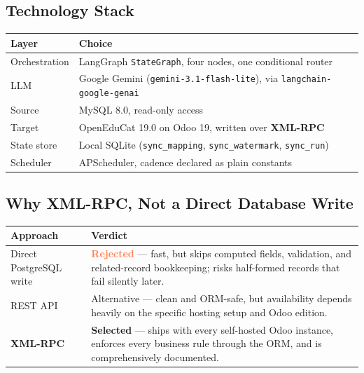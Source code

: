 \documentclass[11pt,a4paper]{article}
\begin{document}
\subsection{Technology Stack}
\begin{table}[h]
\centering
\begin{tabularx}{\textwidth}{@{}l>{\raggedright\arraybackslash}X@{}}
\toprule
\rowcolor{navy!10}
\textbf{\color{navy}Layer} & \textbf{\color{navy}Choice} \\
\midrule
Orchestration & LangGraph \texttt{StateGraph}, four nodes, one conditional router \\
LLM & Google Gemini (\texttt{gemini-3.1-flash-lite}), via \texttt{langchain-google-genai} \\
Source & MySQL 8.0, read-only access \\
Target & OpenEduCat 19.0 on Odoo 19, written over \textbf{XML-RPC} \\
State store & Local SQLite (\texttt{sync\_mapping}, \texttt{sync\_watermark}, \texttt{sync\_run}) \\
Scheduler & APScheduler, cadence declared as plain constants \\
\bottomrule
\end{tabularx}
\end{table}

\subsection{Why XML-RPC, Not a Direct Database Write}
\begin{table}[h]
\centering
\begin{tabularx}{\textwidth}{@{}l>{\raggedright\arraybackslash}X@{}}
\toprule
\rowcolor{navy!10}
\textbf{\color{navy}Approach} & \textbf{\color{navy}Verdict} \\
\midrule
Direct PostgreSQL write & \textcolor{coral}{\bfseries Rejected} --- fast, but skips computed fields, validation, and related-record bookkeeping; risks half-formed records that fail silently later. \\
REST API & Alternative --- clean and ORM-safe, but availability depends heavily on the specific hosting setup and Odoo edition. \\
\textbf{XML-RPC} & \textcolor{teal!70!black}{\bfseries Selected} --- ships with every self-hosted Odoo instance, enforces every business rule through the ORM, and is comprehensively documented. \\
\bottomrule
\end{tabularx}
\end{table}
\end{document}
